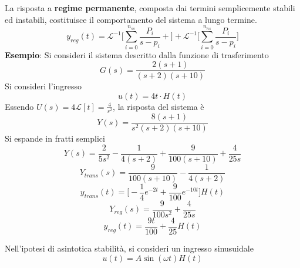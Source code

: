 \documentclass[10pt, letterpaper]{report}
\begin{document}
La risposta a \textbf{regime permanente}, composta dai termini semplicemente stabili ed instabili, costituisce il comportamento del sistema a lungo termine.
$$ 
y_{reg}(t)=\mathcal{L}^{-1}\Big[\sum_{i=0}^{n_{ss}}\frac{P_i}{s-p_i}+\Big]+\mathcal{L}^{-1}\Big[
\sum_{i=0}^{n_{ns}}\frac{P_i}{s-p_i}\Big]$$
\textbf{Esempio}: Si consideri il sistema descritto dalla funzione di trasferimento $$ G(s)=\frac{2(s+1)}{(s+2)(s+10)}$$
Si consideri l'ingresso $$ u(t)=4t\cdot H(t)$$ 
Essendo $U(s)=4\mathcal{L}[t]=\frac{4}{s^2}$, la risposta del sistema è 
$$ Y(s)=\frac{8(s+1)}{s^2(s+2)(s+10)}$$
Si espande in fratti semplici 
$$ Y(s)=\frac{2}{5s^2}-
\frac{1}{4(s+2)}+
\frac{9}{100(s+10)}+
\frac{4}{25s}$$
$$ Y_{trans}(s)=\frac{9}{100(s+10)}-\frac{1}{4(s+2)}$$
$$ y_{trans}(t)=\Big[
-\frac{1}{4}e^{-2t}+\frac{9}{100}e^{-10t}    
\Big]H(t)$$
$$ Y_{reg}(s)=\frac{9}{100s^2}+\frac{4}{25s}$$
$$y_{reg}(t)=\frac{9t}{100}+\frac{4}{25}H(t) $$
\begin{center}
    \begin{figure}[h!]
        \centering
    \end{figure}
\end{center}
Nell'ipotesi di asintotica stabilità, si consideri un ingresso sinusuidale 
$$ u(t)=A\sin(\omega t)H(t)$$
\end{document}
